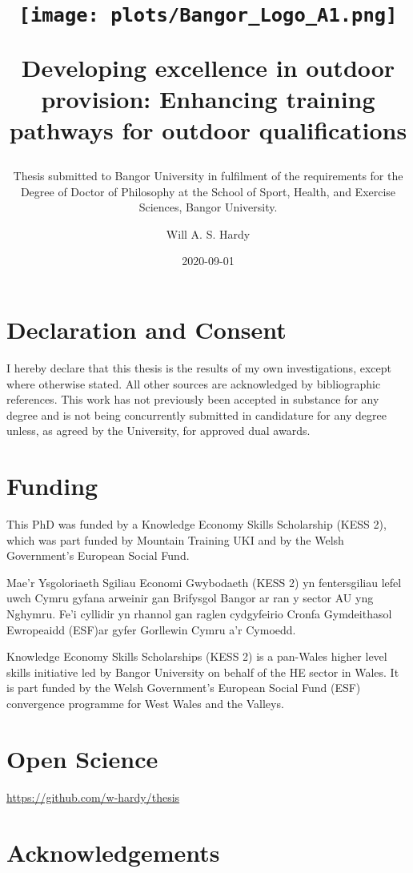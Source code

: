 \documentclass[
  12pt,
  a4paper,
]{book}
\title{\texttt{[image: plots/Bangor\_Logo\_A1.png]}

\textbf{Developing excellence in outdoor provision: Enhancing training pathways for outdoor qualifications}}
\subtitle{\hfill \break  Thesis submitted to Bangor University in fulfilment of the requirements for the Degree of Doctor of Philosophy at the School of Sport, Health, and Exercise Sciences, Bangor University.}
\author{Will A. S. Hardy}
\date{2020-09-01}
\begin{document}
\maketitle

\frontmatter

\section*{Declaration and Consent}

I hereby declare that this thesis is the results of my own investigations, except where otherwise stated. All other sources are acknowledged by bibliographic references. This work has not previously been accepted in substance for any degree and is not being concurrently submitted in candidature for any degree unless, as agreed by the University, for approved dual awards.

\section*{Funding}

This PhD was funded by a Knowledge Economy Skills Scholarship (KESS 2), which was part funded by Mountain Training UKI and by the Welsh Government's European Social Fund.

Mae’r Ysgoloriaeth Sgiliau Economi Gwybodaeth (KESS 2) yn fentersgiliau lefel uwch Cymru gyfana arweinir gan Brifysgol Bangor ar ran y sector AU yng Nghymru. Fe’i cyllidir yn rhannol gan raglen cydgyfeirio Cronfa Gymdeithasol Ewropeaidd (ESF)ar gyfer Gorllewin Cymru a’r Cymoedd.

Knowledge Economy Skills Scholarships (KESS 2) is a pan-Wales higher level skills initiative led by Bangor University on behalf of the HE sector in Wales. It is part funded by the Welsh Government’s European Social Fund (ESF) convergence programme for West Wales and the Valleys.

\section*{Open Science}

\url{https://github.com/w-hardy/thesis}

\section*{Acknowledgements}
\end{document}
